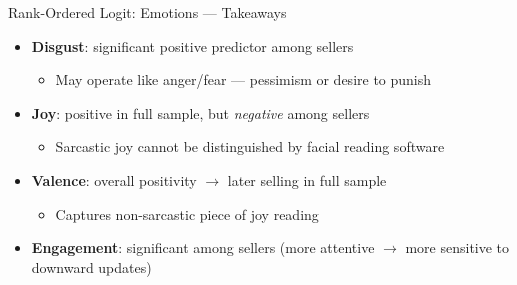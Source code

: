 \documentclass{beamer}
\begin{document}
\begin{frame}{Rank-Ordered Logit: Emotions --- Takeaways}
\begin{itemize}
    \item \textbf{Disgust}: significant positive predictor among sellers
    \begin{itemize}
        \item May operate like anger/fear --- pessimism or desire to punish
    \end{itemize}
    \item \textbf{Joy}: positive in full sample, but \textit{negative} among sellers
    \begin{itemize}
        \item Sarcastic joy cannot be distinguished by facial reading software
    \end{itemize}
    \item \textbf{Valence}: overall positivity $\rightarrow$ later selling in full sample
    \begin{itemize}
        \item Captures non-sarcastic piece of joy reading
    \end{itemize}
    \item \textbf{Engagement}: significant among sellers (more attentive $\rightarrow$ more sensitive to downward updates)
\end{itemize}
\end{frame}
\end{document}
